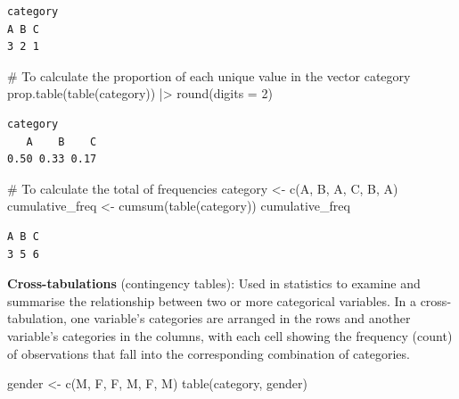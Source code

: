 \documentclass[
  man,
  floatsintext,
  longtable,
  nolmodern,
  notxfonts,
  notimes,
  colorlinks=true,linkcolor=blue,citecolor=blue,urlcolor=blue]{apa7}
\newenvironment{Shaded}{\begin{snugshade}}{\end{snugshade}}
\newcommand{\AttributeTok}[1]{\textcolor[rgb]{0.40,0.45,0.13}{#1}}
\newcommand{\CommentTok}[1]{\textcolor[rgb]{0.37,0.37,0.37}{#1}}
\newcommand{\DecValTok}[1]{\textcolor[rgb]{0.68,0.00,0.00}{#1}}
\newcommand{\FunctionTok}[1]{\textcolor[rgb]{0.28,0.35,0.67}{#1}}
\newcommand{\NormalTok}[1]{\textcolor[rgb]{0.00,0.23,0.31}{#1}}
\newcommand{\OtherTok}[1]{\textcolor[rgb]{0.00,0.23,0.31}{#1}}
\newcommand{\SpecialCharTok}[1]{\textcolor[rgb]{0.37,0.37,0.37}{#1}}
\newcommand{\StringTok}[1]{\textcolor[rgb]{0.13,0.47,0.30}{#1}}
\begin{document}
\begin{verbatim}
category
A B C 
3 2 1 
\end{verbatim}

\begin{Shaded}
\begin{Highlighting}[]
\CommentTok{\# To calculate the proportion of each unique value in the vector category}
\FunctionTok{prop.table}\NormalTok{(}\FunctionTok{table}\NormalTok{(category)) }\SpecialCharTok{|\textgreater{}}
\FunctionTok{round}\NormalTok{(}\AttributeTok{digits =} \DecValTok{2}\NormalTok{)}
\end{Highlighting}
\end{Shaded}

\begin{verbatim}
category
   A    B    C 
0.50 0.33 0.17 
\end{verbatim}

\begin{Shaded}
\begin{Highlighting}[]
\CommentTok{\# To calculate the total of frequencies}
\NormalTok{category }\OtherTok{\textless{}{-}} \FunctionTok{c}\NormalTok{(}\StringTok{\textquotesingle{}A\textquotesingle{}}\NormalTok{, }\StringTok{\textquotesingle{}B\textquotesingle{}}\NormalTok{, }\StringTok{\textquotesingle{}A\textquotesingle{}}\NormalTok{, }\StringTok{\textquotesingle{}C\textquotesingle{}}\NormalTok{, }\StringTok{\textquotesingle{}B\textquotesingle{}}\NormalTok{, }\StringTok{\textquotesingle{}A\textquotesingle{}}\NormalTok{)}
\NormalTok{cumulative\_freq }\OtherTok{\textless{}{-}} \FunctionTok{cumsum}\NormalTok{(}\FunctionTok{table}\NormalTok{(category))}
\NormalTok{cumulative\_freq}
\end{Highlighting}
\end{Shaded}

\begin{verbatim}
A B C 
3 5 6 
\end{verbatim}

\textbf{Cross-tabulations} (contingency tables): Used in statistics to
examine and summarise the relationship between two or more categorical
variables. In a cross-tabulation, one variable's categories are arranged
in the rows and another variable's categories in the columns, with each
cell showing the frequency (count) of observations that fall into the
corresponding combination of categories.

\begin{Shaded}
\begin{Highlighting}[]
\NormalTok{gender }\OtherTok{\textless{}{-}} \FunctionTok{c}\NormalTok{(}\StringTok{\textquotesingle{}M\textquotesingle{}}\NormalTok{, }\StringTok{\textquotesingle{}F\textquotesingle{}}\NormalTok{, }\StringTok{\textquotesingle{}F\textquotesingle{}}\NormalTok{, }\StringTok{\textquotesingle{}M\textquotesingle{}}\NormalTok{, }\StringTok{\textquotesingle{}F\textquotesingle{}}\NormalTok{, }\StringTok{\textquotesingle{}M\textquotesingle{}}\NormalTok{)}
\FunctionTok{table}\NormalTok{(category, gender)}
\end{Highlighting}
\end{Shaded}
\end{document}
